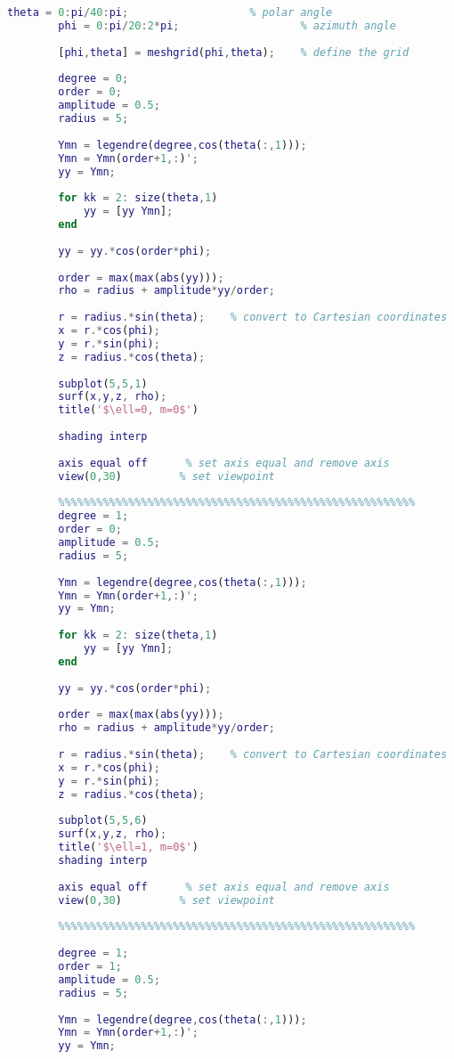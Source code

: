 	\begin{lstlisting}[language=MATLAB]
		theta = 0:pi/40:pi;                   % polar angle
		phi = 0:pi/20:2*pi;                   % azimuth angle
		
		[phi,theta] = meshgrid(phi,theta);    % define the grid
		
		degree = 0;
		order = 0;
		amplitude = 0.5;
		radius = 5;
		
		Ymn = legendre(degree,cos(theta(:,1)));
		Ymn = Ymn(order+1,:)';
		yy = Ymn;
		
		for kk = 2: size(theta,1)
		    yy = [yy Ymn];
		end
		
		yy = yy.*cos(order*phi);
		
		order = max(max(abs(yy)));
		rho = radius + amplitude*yy/order;
		
		r = radius.*sin(theta);    % convert to Cartesian coordinates
		x = r.*cos(phi);
		y = r.*sin(phi);
		z = radius.*cos(theta);
		
		subplot(5,5,1)
		surf(x,y,z, rho);
		title('$\ell=0, m=0$')
		
		shading interp
		
		axis equal off      % set axis equal and remove axis
		view(0,30)         % set viewpoint
		
		%%%%%%%%%%%%%%%%%%%%%%%%%%%%%%%%%%%%%%%%%%%%%%%%%%%%%%%%
		degree = 1;
		order = 0;
		amplitude = 0.5;
		radius = 5;
		
		Ymn = legendre(degree,cos(theta(:,1)));
		Ymn = Ymn(order+1,:)';
		yy = Ymn;
		
		for kk = 2: size(theta,1)
		    yy = [yy Ymn];
		end
		
		yy = yy.*cos(order*phi);
		
		order = max(max(abs(yy)));
		rho = radius + amplitude*yy/order;
		
		r = radius.*sin(theta);    % convert to Cartesian coordinates
		x = r.*cos(phi);
		y = r.*sin(phi);
		z = radius.*cos(theta);
		
		subplot(5,5,6)
		surf(x,y,z, rho);
		title('$\ell=1, m=0$')
		shading interp
		
		axis equal off      % set axis equal and remove axis
		view(0,30)         % set viewpoint
		
		%%%%%%%%%%%%%%%%%%%%%%%%%%%%%%%%%%%%%%%%%%%%%%%%%%%%%%%%
		
		degree = 1;
		order = 1;
		amplitude = 0.5;
		radius = 5;
		
		Ymn = legendre(degree,cos(theta(:,1)));
		Ymn = Ymn(order+1,:)';
		yy = Ymn;
		

\end{lstlisting}
